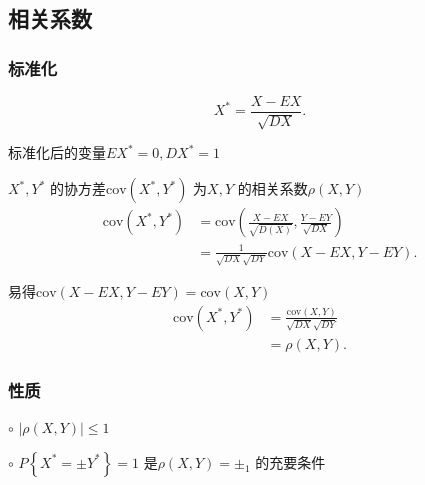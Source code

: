 \subsection{相关系数}%
\label{sub:相关系数}
\subsubsection{标准化}%
\label{subsub:标准化}
\[
    X^*=\frac{X-EX}{\sqrt{DX} } 
.\] 

标准化后的变量$EX^*=0,DX^*=1$

\begin{defi}
    $X^*,Y^*$ 的协方差$\text{cov}\left( X^*,Y^* \right) $ 为$X,Y$ 的相关系数$\rho\left( X,Y \right) $
    \begin{align*}
        \text{cov}\left( X^*,Y^* \right) &=\text{cov}\left( \frac{X-EX }{\sqrt{D\left( X \right) } } ,\frac{Y-EY}{\sqrt{DX} }  \right) \\
        &= \frac{1}{\sqrt{DX} \sqrt{DY} } \text{cov}\left( X-EX,Y-EY \right)
    .\end{align*}

    易得$\text{cov}\left( X-EX,Y-EY \right) =\text{cov}\left( X,Y \right) $
    \begin{align*}
        \text{cov}\left( X^*,Y^* \right) &= \frac{\text{cov}\left( X,Y \right) }{\sqrt{DX}\sqrt{DY} }  \\
        &= \rho\left( X,Y \right) 
    .\end{align*}
\end{defi}

\subsubsection{性质}%
\label{subsub:性质}
$\circ$ $\left| \rho\left( X,Y \right)  \right| \le 1$ 

$\circ$ $\displaystyle{P\left\{ X^*=\pm Y^* \right\} =1}$ 是$\rho\left( X,Y \right) =\pm_1$ 的充要条件


